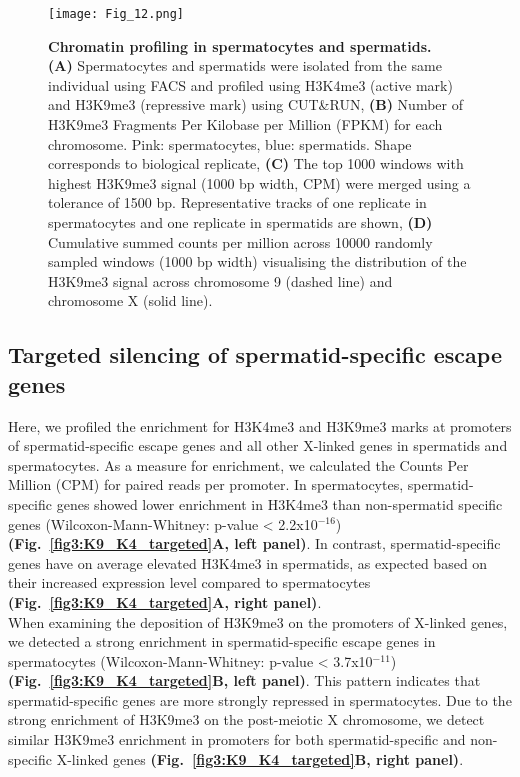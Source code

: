 \begin{figure}[!h]
\centering
\texttt{[image: Fig\_12.png]}
\caption[Chromatin profiling in spermatocytes and spermatids]{\textbf{Chromatin profiling in spermatocytes and spermatids.} \\
\textbf{(A)} Spermatocytes and spermatids were isolated from the same individual using FACS and profiled using H3K4me3 (active mark) and H3K9me3 (repressive mark) using CUT\&{}RUN, \textbf{(B)} Number of H3K9me3 Fragments Per Kilobase per Million (FPKM) for each chromosome. Pink: spermatocytes, blue: spermatids. Shape corresponds to biological replicate, \textbf{(C)} The top 1000 windows with highest H3K9me3 signal (1000 bp width, CPM) were merged using a tolerance of 1500 bp. Representative tracks of one replicate in spermatocytes and one replicate in spermatids are shown, \textbf{(D)} Cumulative summed counts per million across 10000 randomly sampled windows (1000 bp width) visualising the distribution of the H3K9me3 signal across chromosome 9 (dashed line) and chromosome X (solid line).}
\label{fig3:K9_global}
\end{figure}

\newpage

\subsection{Targeted silencing of spermatid-specific escape genes}

Here, we profiled the enrichment for H3K4me3 and H3K9me3 marks at promoters of spermatid-specific escape genes and all other X-linked genes in spermatids and spermatocytes. As a measure for enrichment, we calculated the Counts Per Million (CPM) for paired reads per promoter. In spermatocytes, spermatid-specific genes showed lower enrichment in H3K4me3 than non-spermatid specific genes (Wilcoxon-Mann-Whitney: p-value < 2.2x10$^{-16}$) \textbf{(Fig.~\ref{fig3:K9_K4_targeted}A, left panel)}. In contrast, spermatid-specific genes have on average elevated H3K4me3 in spermatids, as expected based on their increased expression level compared to spermatocytes \textbf{(Fig.~\ref{fig3:K9_K4_targeted}A, right panel)}. \\


When examining the deposition of H3K9me3 on the promoters of X-linked genes, we detected a strong enrichment in spermatid-specific escape genes in spermatocytes (Wilcoxon-Mann-Whitney: p-value < 3.7x10$^{-11}$) \textbf{(Fig.~\ref{fig3:K9_K4_targeted}B, left panel)}. This pattern indicates that spermatid-specific genes are more strongly repressed in spermatocytes. Due to the strong enrichment of H3K9me3 on the post-meiotic X chromosome, we detect similar H3K9me3 enrichment in promoters for both spermatid-specific and non-specific X-linked genes \textbf{(Fig.~\ref{fig3:K9_K4_targeted}B, right panel)}.\\

